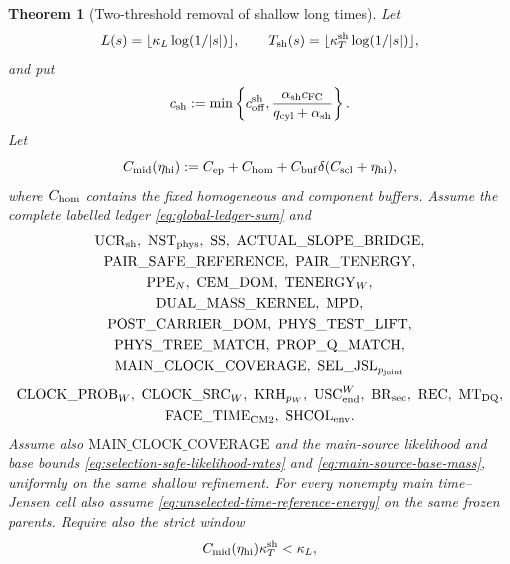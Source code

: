 \documentclass[11pt]{article}
\newtheorem{theorem}{Theorem}[section]
\begin{document}
\begin{theorem}[Two-threshold removal of shallow long times]
\label{thm:shallow-two-threshold}
Let
\[
 L(s)=\lfloor\kappa_L\log(1/|s|)\rfloor,
 \qquad T_{\rm sh}(s)=\lfloor\kappa_T^{\rm sh}\log(1/|s|)\rfloor,
\]
and put
\begin{equation}
\label{eq:shallow-collar-rate}
 c_{\rm sh}:=\min\left\{c_{\rm off}^{\rm sh},
 \frac{\alpha_{\rm sh}c_{\rm FC}}
 {q_{\rm cyl}+\alpha_{\rm sh}}\right\}.
\end{equation}
Let
\begin{equation}
\label{eq:intermediate-resolving-constant}
 C_{\rm mid}(\eta_{\rm hi})
 :=C_{\rm ep}+C_{\rm hom}
   +C_{\rm buf}\delta(C_{\rm scl}+\eta_{\rm hi}),
\end{equation}
where $C_{\rm hom}$ contains the fixed homogeneous and component buffers.
Assume the complete labelled ledger \eqref{eq:global-ledger-sum} and
\[
 \begin{gathered}
 \mathrm{UCR}_{\rm sh},\ \mathrm{NST}_{\rm phys},\ \mathrm{SS},\
 \mathrm{ACTUAL\_SLOPE\_BRIDGE},\\
 \mathrm{PAIR\_SAFE\_REFERENCE},\ \mathrm{PAIR\_TENERGY},\\
 \mathrm{PPE}_{N},\ \mathrm{CEM\_DOM},\ \mathrm{TENERGY}_{W},\\
 \mathrm{DUAL\_MASS\_KERNEL},\ \mathrm{MPD},\\
 \mathrm{POST\_CARRIER\_DOM},\ \mathrm{PHYS\_TEST\_LIFT},\\
 \mathrm{PHYS\_TREE\_MATCH},\ \mathrm{PROP\_Q\_MATCH},\\
 \mathrm{MAIN\_CLOCK\_COVERAGE},\
 \mathrm{SEL\_JSL}_{p_{\rm joint}}
 \end{gathered}
\]
\[
\begin{gathered}
 \mathrm{CLOCK\_PROB}_{W},\ \mathrm{CLOCK\_SRC}_{W},\
 \mathrm{KRH}_{p_W},\ \mathrm{USC}_{\rm end}^{W},\
 \mathrm{BR}_{\rm sec},\ \mathrm{REC},\ \mathrm{MT}_{\rm DQ},\\
 \mathrm{FACE\_TIME}_{\rm CM2},\ \mathrm{SHCOL}_{\rm env}.
\end{gathered}
\]
Assume also $\mathrm{MAIN\_CLOCK\_COVERAGE}$ and the main-source likelihood
and base bounds \eqref{eq:selection-safe-likelihood-rates} and
\eqref{eq:main-source-base-mass}, uniformly on the same shallow refinement.
For every nonempty main time--Jensen cell also assume
\eqref{eq:unselected-time-reference-energy} on the same frozen parents.
Require also the strict window
\begin{equation}
\label{eq:shallow-time-window}
 C_{\rm mid}(\eta_{\rm hi})\kappa_T^{\rm sh}<\kappa_L,

\end{equation}
\end{theorem}
\end{document}
